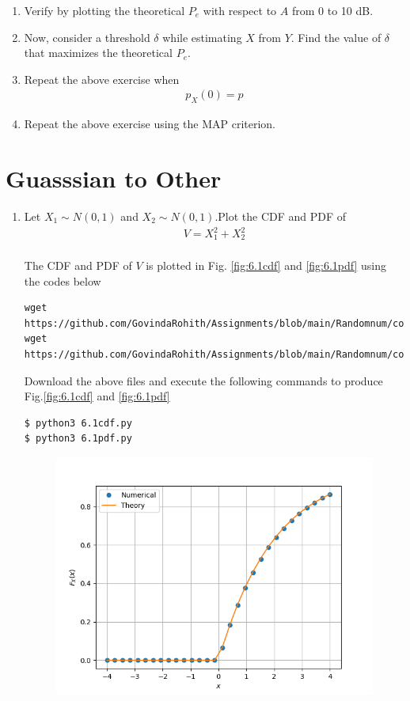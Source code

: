 \documentclass[journal,12pt,twocolumn]{IEEEtran}
\renewcommand\thesection{\arabic{section}}
\begin{document}
\begin{enumerate}[label=\thesection.\arabic*
,ref=\thesection.\theenumi]
\begin{enumerate}[label=\thesection.\arabic*
,ref=\thesection.\theenumi]
%
\item
Verify by plotting  the theoretical $P_e$ with respect to $A$ from 0 to 10 dB.  
%
\item Now, consider a threshold $\delta$  while estimating $X$ from $Y$. Find the value of $\delta$ that maximizes the theoretical $P_e$.
\item Repeat the above exercise when 
	\begin{align}
		p_{X}(0) = p
	\end{align}
\item Repeat the above exercise using the MAP criterion.
		\end{enumerate}
\section{Guasssian to Other}
\begin{enumerate}[label=\thesection.\arabic*
,ref=\thesection.\theenumi]
\item Let $X_1  \sim N(0,1) $ and $X_2  \sim N(0,1) $.Plot the CDF and PDF of 
\begin{align}
    V=X_1^2+X_2^2
    \end{align}
\solution\\
The CDF and PDF of $V$ is plotted in Fig. \ref{fig:6.1cdf} and \ref{fig:6.1pdf} using the codes below
\begin{lstlisting}
wget https://github.com/GovindaRohith/Assignments/blob/main/Randomnum/codes/6.1cdf.py
wget https://github.com/GovindaRohith/Assignments/blob/main/Randomnum/codes/6.1pdf.py
\end{lstlisting}
Download the above files and execute the following commands to produce Fig.\ref{fig:6.1cdf} and \ref{fig:6.1pdf}
\begin{lstlisting}
$ python3 6.1cdf.py
$ python3 6.1pdf.py
\end{lstlisting}
\begin{figure}[!h]
\centering
\includegraphics[width=\columnwidth]{./figs/6.1cdf.png}

\end{figure}
\end{enumerate}
\end{enumerate}
\end{document}
